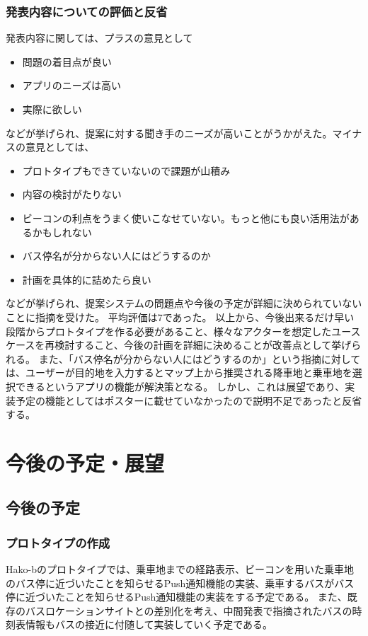 \documentclass[openany,11pt,papersize]{jsbook}
\begin{document}

\subsection{発表内容についての評価と反省}
発表内容に関しては、プラスの意見として
\begin{itemize}

\item 問題の着目点が良い
\item アプリのニーズは高い
\item 実際に欲しい

\end{itemize}
などが挙げられ、提案に対する聞き手のニーズが高いことがうかがえた。マイナスの意見としては、
\begin{itemize}

\item プロトタイプもできていないので課題が山積み
\item 内容の検討がたりない
\item ビーコンの利点をうまく使いこなせていない。もっと他にも良い活用法があるかもしれない
\item バス停名が分からない人にはどうするのか
\item 計画を具体的に詰めたら良い

\end{itemize}
などが挙げられ、提案システムの問題点や今後の予定が詳細に決められていないことに指摘を受けた。
平均評価は7であった。
以上から、今後出来るだけ早い段階からプロトタイプを作る必要があること、様々なアクターを想定したユースケースを再検討すること、今後の計画を詳細に決めることが改善点として挙げられる。
また、「バス停名が分からない人にはどうするのか」という指摘に対しては、ユーザーが目的地を入力するとマップ上から推奨される降車地と乗車地を選択できるというアプリの機能が解決策となる。
しかし、これは展望であり、実装予定の機能としてはポスターに載せていなかったので説明不足であったと反省する。


\chapter{今後の予定・展望}
\section{今後の予定}
\subsection{プロトタイプの作成}
Hako-bのプロトタイプでは、乗車地までの経路表示、ビーコンを用いた乗車地のバス停に近づいたことを知らせるPush通知機能の実装、乗車するバスがバス停に近づいたことを知らせるPush通知機能の実装をする予定である。
また、既存のバスロケーションサイトとの差別化を考え、中間発表で指摘されたバスの時刻表情報もバスの接近に付随して実装していく予定である。
\end{document}
